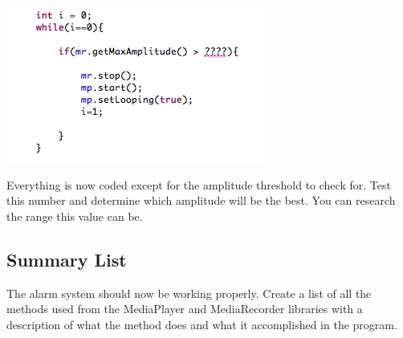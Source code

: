 \begin{center}

\includegraphics[scale=1]{amp.png} 

\end{center}

\noindent
Everything is now coded except for the amplitude threshold to check for. Test this number and determine which amplitude will be the best. You can research the range this value can be.

\subsection{Summary List}
The alarm system should now be working properly. Create a list of all the methods used from the MediaPlayer and MediaRecorder libraries with a description of what the method does and what it accomplished in the program.